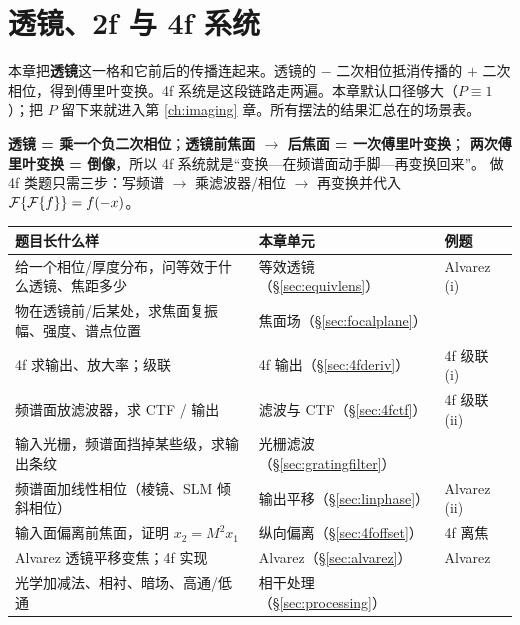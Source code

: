 \chapter{透镜、2f 与 4f 系统}\label{ch:lens}

\begin{idea}
本章把\textbf{透镜}这一格和它前后的传播连起来。透镜的 $-$ 二次相位抵消传播的 $+$ 二次相位，得到傅里叶变换。4f 系统是这段链路走两遍。本章默认口径够大（$P\equiv1$）；把 $P$ 留下来就进入第 \ref{ch:imaging} 章。所有摆法的结果汇总在\pageref{sec:p-scenes}的场景表。
\end{idea}

\begin{idea}[一句话版本]
\textbf{透镜 = 乘一个负二次相位}；\textbf{透镜前焦面 $\to$ 后焦面 = 一次傅里叶变换}；
\textbf{两次傅里叶变换 = 倒像}，所以 4f 系统就是“变换—在频谱面动手脚—再变换回来”。
做 4f 类题只需三步：写频谱 $\to$ 乘滤波器/相位 $\to$ 再变换并代入 $\mathcal{F}\{\mathcal{F}\{f\}\}=f(-x)$。
\end{idea}

\begin{idea}
\begin{tabular}{@{}P{6.2cm}P{5.6cm}P{3.4cm}@{}}
题目长什么样 & 本章单元 & 例题\\ \hline
给一个相位/厚度分布，问等效于什么透镜、焦距多少 & 等效透镜（§\ref{sec:equivlens}）& Alvarez (i)\\
物在透镜前/后某处，求焦面复振幅、强度、谱点位置 & 焦面场（§\ref{sec:focalplane}）& \\
4f 求输出、放大率；级联 & 4f 输出（§\ref{sec:4fderiv}）& 4f 级联 (i)\\
频谱面放滤波器，求 CTF / 输出 & 滤波与 CTF（§\ref{sec:4fctf}）& 4f 级联 (ii)\\
输入光栅，频谱面挡掉某些级，求输出条纹 & 光栅滤波（§\ref{sec:gratingfilter}）& \\
频谱面加线性相位（棱镜、SLM 倾斜相位）& 输出平移（§\ref{sec:linphase}）& Alvarez (ii)\\
输入面偏离前焦面，证明 $x_2=M^2x_1$ & 纵向偏离（§\ref{sec:4foffset}）& 4f 离焦\\
Alvarez 透镜平移变焦；4f 实现 & Alvarez（§\ref{sec:alvarez}）& Alvarez\\
光学加减法、相衬、暗场、高通/低通 & 相干处理（§\ref{sec:processing}）& \\
\end{tabular}
\end{idea}

